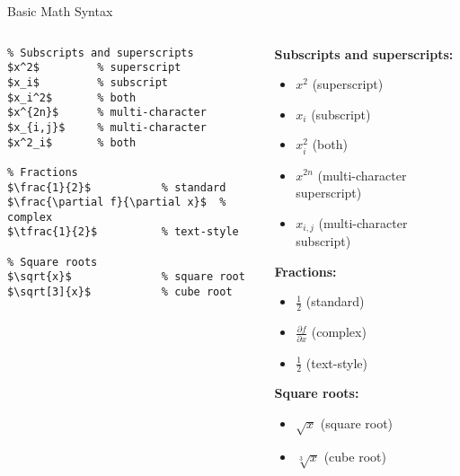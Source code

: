 \begin{frame}[fragile]{Basic Math Syntax}
    \begin{columns}
        \begin{column}{0.5\textwidth}
            \begin{lstlisting}
% Subscripts and superscripts
$x^2$         % superscript
$x_i$         % subscript
$x_i^2$       % both
$x^{2n}$      % multi-character
$x_{i,j}$     % multi-character
$x^2_i$       % both

% Fractions
$\frac{1}{2}$           % standard
$\frac{\partial f}{\partial x}$  % complex
$\tfrac{1}{2}$          % text-style

% Square roots
$\sqrt{x}$              % square root
$\sqrt[3]{x}$           % cube root
            \end{lstlisting}
        \end{column}
        
        \begin{column}{0.5\textwidth}
            \textbf{Subscripts and superscripts:}
            \begin{itemize}
                \item $x^2$ (superscript)
                \item $x_i$ (subscript)
                \item $x_i^2$ (both)
                \item $x^{2n}$ (multi-character superscript)
                \item $x_{i,j}$ (multi-character subscript)
            \end{itemize}
            
            \textbf{Fractions:}
            \begin{itemize}
                \item $\frac{1}{2}$ (standard)
                \item $\frac{\partial f}{\partial x}$ (complex)
                \item $\tfrac{1}{2}$ (text-style)
            \end{itemize}
            
            \textbf{Square roots:}
            \begin{itemize}
                \item $\sqrt{x}$ (square root)
                \item $\sqrt[3]{x}$ (cube root)
            \end{itemize}
        \end{column}
    \end{columns}
\end{frame}

